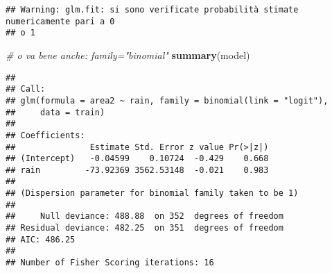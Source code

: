 \documentclass[
]{article}
\newenvironment{Shaded}{\begin{snugshade}}{\end{snugshade}}
\newcommand{\AttributeTok}[1]{\textcolor[rgb]{0.13,0.29,0.53}{#1}}
\newcommand{\CommentTok}[1]{\textcolor[rgb]{0.56,0.35,0.01}{\textit{#1}}}
\newcommand{\ConstantTok}[1]{\textcolor[rgb]{0.56,0.35,0.01}{#1}}
\newcommand{\DecValTok}[1]{\textcolor[rgb]{0.00,0.00,0.81}{#1}}
\newcommand{\FloatTok}[1]{\textcolor[rgb]{0.00,0.00,0.81}{#1}}
\newcommand{\FunctionTok}[1]{\textcolor[rgb]{0.13,0.29,0.53}{\textbf{#1}}}
\newcommand{\NormalTok}[1]{#1}
\newcommand{\OtherTok}[1]{\textcolor[rgb]{0.56,0.35,0.01}{#1}}
\newcommand{\SpecialCharTok}[1]{\textcolor[rgb]{0.81,0.36,0.00}{\textbf{#1}}}
\newcommand{\StringTok}[1]{\textcolor[rgb]{0.31,0.60,0.02}{#1}}
\begin{document}
\begin{Shaded}
\end{Shaded}

\begin{verbatim}
## Warning: glm.fit: si sono verificate probabilità stimate numericamente pari a 0
## o 1
\end{verbatim}

\begin{Shaded}
\begin{Highlighting}[]
\CommentTok{\# o va bene anche: family="binomial"}
\FunctionTok{summary}\NormalTok{(model)}
\end{Highlighting}
\end{Shaded}

\begin{verbatim}
## 
## Call:
## glm(formula = area2 ~ rain, family = binomial(link = "logit"), 
##     data = train)
## 
## Coefficients:
##               Estimate Std. Error z value Pr(>|z|)
## (Intercept)   -0.04599    0.10724  -0.429    0.668
## rain         -73.92369 3562.53148  -0.021    0.983
## 
## (Dispersion parameter for binomial family taken to be 1)
## 
##     Null deviance: 488.88  on 352  degrees of freedom
## Residual deviance: 482.25  on 351  degrees of freedom
## AIC: 486.25
## 
## Number of Fisher Scoring iterations: 16
\end{verbatim}
\end{document}

